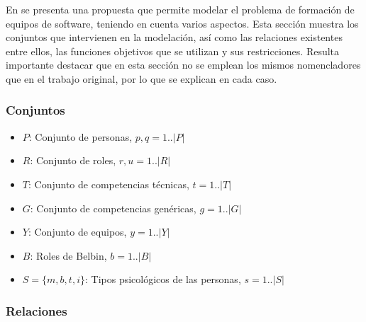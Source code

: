 En \cite{Duran2019} se presenta una propuesta que permite modelar el problema de formación de equipos de software, teniendo en cuenta varios aspectos. Esta sección muestra los conjuntos que intervienen en la modelación, así como las relaciones existentes entre ellos, las funciones objetivos que se utilizan y sus restricciones. Resulta importante destacar que en esta sección no se emplean los mismos nomencladores que en el trabajo original, por lo que se explican en cada caso.

\subsubsection{Conjuntos} \label{entidades}

\begin{itemize}
  \item $P$: Conjunto de personas, $p, q= 1.. |P|$
  \item $R$: Conjunto de roles, $r,u= 1.. |R|$
  \item $T$: Conjunto de competencias técnicas, $t= 1.. |T|$
  \item $G$: Conjunto de competencias genéricas, $g= 1.. |G|$
  \item $Y$: Conjunto de equipos, $y= 1.. |Y|$
  \item $B$: Roles de Belbin, $b= 1.. |B|$
  \item $S= \{m,b,t,i\}$: Tipos psicológicos de las personas, $s= 1.. |S| $
\end{itemize}

\subsubsection{Relaciones} \label{relaciones}

